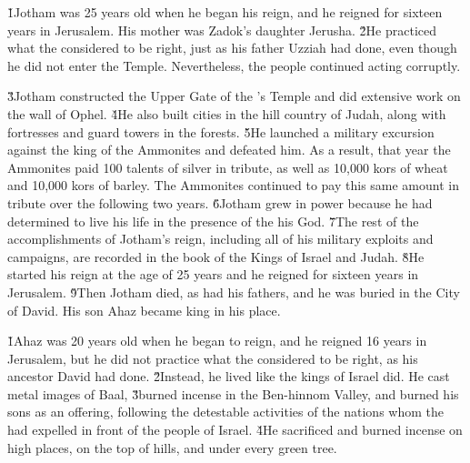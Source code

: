 \v{1}Jotham was 25 years old when he began his reign, and he reigned for sixteen years in Jerusalem. His mother was Zadok's daughter Jerusha. \v{2}He practiced what the  considered to be right, just as his father Uzziah had done, even though he did not enter the Temple. Nevertheless, the people continued acting corruptly.

\v{3}Jotham constructed the Upper Gate of the 's Temple and did extensive work on the wall of Ophel. \v{4}He also built cities in the hill country of Judah, along with fortresses and guard towers in the forests. \v{5}He launched a military excursion against the king of the Ammonites and defeated him. As a result, that year the Ammonites paid 100 talents of silver in tribute, as well as 10,000 kors of wheat and 10,000 kors of barley. The Ammonites continued to pay this same amount in tribute over the following two years. \v{6}Jotham grew in power because he had determined to live his life in the presence of the  his God. \v{7}The rest of the accomplishments of Jotham's reign, including all of his military exploits and campaigns, are recorded in the book of the Kings of Israel and Judah. \v{8}He started his reign at the age of 25 years and he reigned for sixteen years in Jerusalem. \v{9}Then Jotham died, as had his fathers, and he was buried in the City of David. His son Ahaz became king in his place.

\v{1}Ahaz was 20 years old when he began to reign, and he reigned 16 years in Jerusalem, but he did not practice what the  considered to be right, as his ancestor David had done. \v{2}Instead, he lived like the kings of Israel did. He cast metal images of Baal, \v{3}burned incense in the Ben-hinnom Valley, and burned his sons as an offering, following the detestable activities of the nations whom the  had expelled in front of the people of Israel. \v{4}He sacrificed and burned incense on high places, on the top of hills, and under every green tree.

